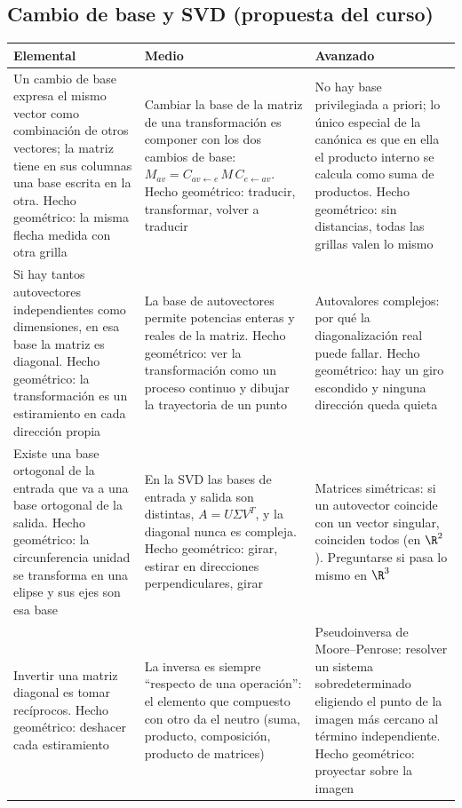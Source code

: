 \subsection{Cambio de base y SVD (propuesta del curso)}

{\small
\begin{tabularx}{\textwidth}{YYY}
\toprule
\textbf{Elemental} & \textbf{Medio} & \textbf{Avanzado}\\
\midrule
Un cambio de base expresa el mismo vector como combinación de otros vectores; la matriz
tiene en sus columnas una base escrita en la otra. Hecho geométrico: la misma flecha medida
con otra grilla &
Cambiar la base de la matriz de una transformación es componer con los dos cambios de
base: \(M_{av}=C_{av\leftarrow e}\,M\,C_{e\leftarrow av}\). Hecho geométrico: traducir,
transformar, volver a traducir &
No hay base privilegiada a priori; lo único especial de la canónica es que en ella el
producto interno se calcula como suma de productos. Hecho geométrico: sin distancias, todas
las grillas valen lo mismo\\
\addlinespace
Si hay tantos autovectores independientes como dimensiones, en esa base la matriz es
diagonal. Hecho geométrico: la transformación es un estiramiento en cada dirección propia &
La base de autovectores permite potencias enteras y reales de la matriz. Hecho geométrico:
ver la transformación como un proceso continuo y dibujar la trayectoria de un punto &
Autovalores complejos: por qué la diagonalización real puede fallar. Hecho geométrico: hay
un giro escondido y ninguna dirección queda quieta\\
\addlinespace
Existe una base ortogonal de la entrada que va a una base ortogonal de la salida. Hecho
geométrico: la circunferencia unidad se transforma en una elipse y sus ejes son esa base &
En la SVD las bases de entrada y salida son distintas, \(A=U\Sigma V^{T}\), y la diagonal
nunca es compleja. Hecho geométrico: girar, estirar en direcciones perpendiculares, girar &
Matrices simétricas: si un autovector coincide con un vector singular, coinciden todos (en
\(\R^2\)). Preguntarse si pasa lo mismo en \(\R^3\)\\
\addlinespace
Invertir una matriz diagonal es tomar recíprocos. Hecho geométrico: deshacer cada
estiramiento &
La inversa es siempre ``respecto de una operación'': el elemento que compuesto con otro da
el neutro (suma, producto, composición, producto de matrices) &
Pseudoinversa de Moore--Penrose: resolver un sistema sobredeterminado eligiendo el punto de
la imagen más cercano al término independiente. Hecho geométrico: proyectar sobre la imagen\\
\bottomrule
\end{tabularx}
}

